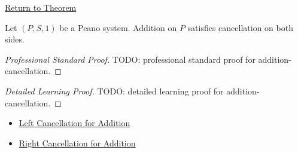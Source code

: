 \newpage
{}
\label{prf:addition-cancellation}

\begin{remark*}[Return]
\hyperref[thm:addition-cancellation]{Return to Theorem}
\end{remark*}

\begin{theorem*}
Let $(P,S,1)$ be a Peano system. Addition on $P$ satisfies cancellation on
both sides.
\end{theorem*}

\begin{proof}[Professional Standard Proof]
\LRAProofBodyStart
TODO: professional standard proof for addition-cancellation.
\end{proof}

\begin{proof}[Detailed Learning Proof]
\LRAProofBodyStart
TODO: detailed learning proof for addition-cancellation.
\end{proof}

\begin{remark*}
\end{remark*}

\begin{dependencies}
\begin{itemize}
  \item \hyperref[thm:addition-left-cancellation]{Left Cancellation for Addition}
  \item \hyperref[thm:addition-right-cancellation]{Right Cancellation for Addition}
\end{itemize}
\end{dependencies}

\clearpage
